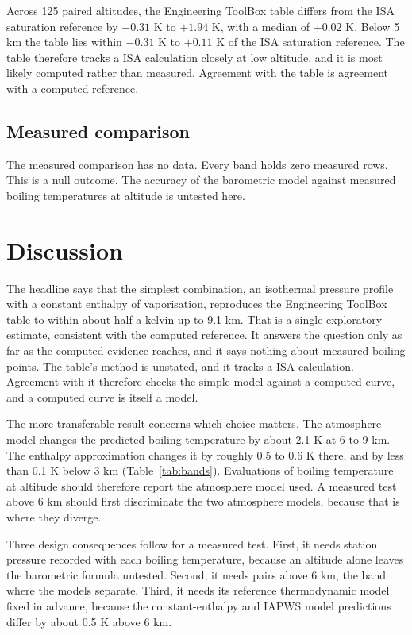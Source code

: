 \documentclass[11pt,letterpaper]{article}
\begin{document}
Across 125 paired altitudes, the Engineering ToolBox table differs from the ISA saturation reference by $-0.31$ K to $+1.94$ K, with a median of $+0.02$ K. Below 5 km the table lies within $-0.31$ K to $+0.11$ K of the ISA saturation reference. The table therefore tracks a ISA calculation closely at low altitude, and it is most likely computed rather than measured. Agreement with the table is agreement with a computed reference.

\subsection{Measured comparison}\label{sec:measured}

The measured comparison has no data. Every band holds zero measured rows. This is a null outcome. The accuracy of the barometric model against measured boiling temperatures at altitude is untested here.

\section{Discussion}\label{sec:discussion}

The headline says that the simplest combination, an isothermal pressure profile with a constant enthalpy of vaporisation, reproduces the Engineering ToolBox table to within about half a kelvin up to 9.1 km. That is a single exploratory estimate, consistent with the computed reference. It answers the question only as far as the computed evidence reaches, and it says nothing about measured boiling points. The table's method is unstated, and it tracks a ISA calculation. Agreement with it therefore checks the simple model against a computed curve, and a computed curve is itself a model.

The more transferable result concerns which choice matters. The atmosphere model changes the predicted boiling temperature by about 2.1 K at 6 to 9 km. The enthalpy approximation changes it by roughly 0.5 to 0.6 K there, and by less than 0.1 K below 3 km (Table~\ref{tab:bands}). Evaluations of boiling temperature at altitude should therefore report the atmosphere model used. A measured test above 6 km should first discriminate the two atmosphere models, because that is where they diverge.

Three design consequences follow for a measured test. First, it needs station pressure recorded with each boiling temperature, because an altitude alone leaves the barometric formula untested. Second, it needs pairs above 6 km, the band where the models separate. Third, it needs its reference thermodynamic model fixed in advance, because the constant-enthalpy and IAPWS model predictions differ by about 0.5 K above 6 km.
\end{document}
